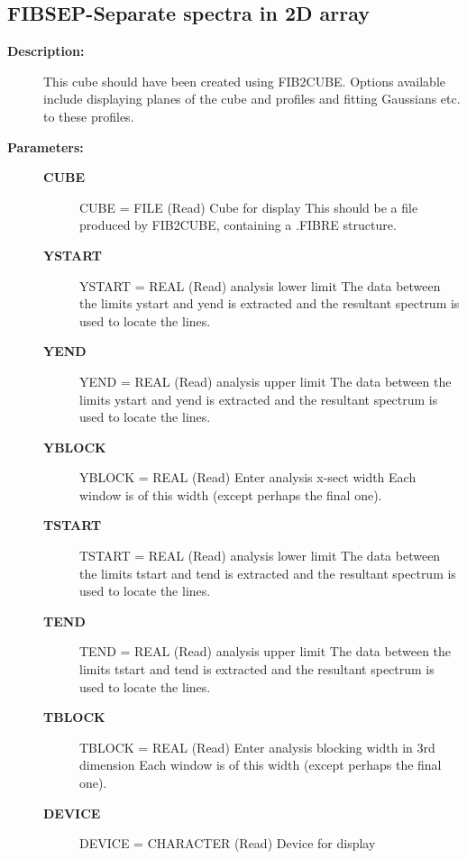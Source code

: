 \begin{description}
\begin{description}
\begin{terminalv}
\end{terminalv}
\end{description}
\subsection{FIBSEP-\label{FIBSEP}Separate spectra in 2D array}
\begin{description}

\item [\textbf{Description:}]
    This cube should have been created using FIB2CUBE. Options available
    include displaying planes of the cube and profiles and fitting
    Gaussians etc. to these profiles.

\item [\textbf{Parameters:}]
\begin{description}
\item [\textbf{CUBE}]
    CUBE = FILE (Read)
        Cube for display
          This should be a file produced by FIB2CUBE, containing
          a .FIBRE structure.
\item [\textbf{YSTART}]
    YSTART = REAL (Read)
        analysis lower limit
            The data between the limits ystart and yend is extracted
            and the resultant spectrum is used to locate the lines.
\item [\textbf{YEND}]
    YEND = REAL (Read)
        analysis upper limit
            The data between the limits ystart and yend is extracted
            and the resultant spectrum is used to locate the lines.
\item [\textbf{YBLOCK}]
    YBLOCK = REAL (Read)
        Enter analysis x-sect width
            Each window is of this width (except perhaps the final one).
\item [\textbf{TSTART}]
    TSTART = REAL (Read)
        analysis lower limit
            The data between the limits tstart and tend is extracted
            and the resultant spectrum is used to locate the lines.
\item [\textbf{TEND}]
    TEND = REAL (Read)
        analysis upper limit
            The data between the limits tstart and tend is extracted
            and the resultant spectrum is used to locate the lines.
\item [\textbf{TBLOCK}]
    TBLOCK = REAL (Read)
        Enter analysis blocking width in 3rd dimension
            Each window is of this width (except perhaps the final one).
\item [\textbf{DEVICE}]
    DEVICE = CHARACTER (Read)
        Device for display

\end{description}
\end{description}
\end{description}
